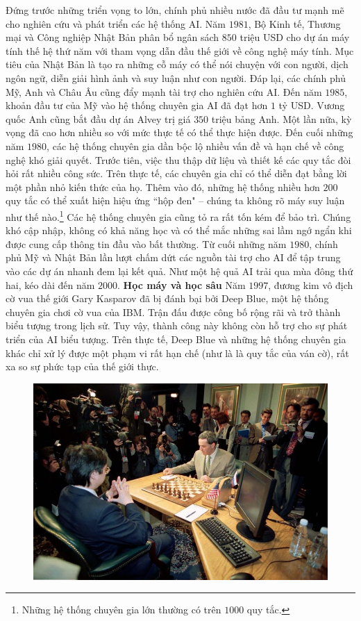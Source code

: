 \begin{multicols}{2}
	\vskip 0.1cm
	Đứng trước những triển vọng to lớn, chính phủ nhiều nước đã đầu tư mạnh mẽ cho nghiên cứu và phát triển các hệ thống AI. Năm $1981$, Bộ Kinh tế, Thương mại và Công nghiệp Nhật Bản phân bổ ngân sách $850$ triệu USD cho dự án máy tính thế hệ thứ năm với tham vọng dẫn đầu thế giới về công nghệ máy tính. Mục tiêu của Nhật Bản là tạo ra những cỗ máy có thể nói chuyện với con người, dịch ngôn ngữ, diễn giải hình ảnh và suy luận như con người. Đáp lại, các chính phủ Mỹ, Anh và Châu Âu cũng đẩy mạnh tài trợ cho nghiên cứu AI. Đến năm $1985$, khoản đầu tư của Mỹ vào hệ thống chuyên gia AI đã đạt hơn $1$ tỷ USD. Vương quốc Anh cũng bắt đầu dự án Alvey trị giá $350$ triệu bảng Anh.
	\vskip 0.1cm
	Một lần nữa, kỳ vọng đã cao hơn nhiều so với mức thực tế có thể thực hiện được. Đến cuối những năm $1980$, các hệ thống chuyên gia dần bộc lộ nhiều vấn đề và hạn chế về công nghệ khó giải quyết. Trước tiên, việc thu thập dữ liệu và thiết kế các quy tắc đòi hỏi rất nhiều công sức. Trên thực tế, các chuyên gia chỉ có thể diễn đạt bằng lời một phần nhỏ kiến thức của họ. Thêm vào đó, những hệ thống nhiều hơn $200$ quy tắc có thể xuất hiện hiệu ứng ``hộp đen" -- chúng ta không rõ máy suy luận như thế nào.\footnote{\color{cackithi}Những hệ thống chuyên gia lớn thường có trên $1000$ quy tắc.} Các hệ thống chuyên gia cũng tỏ ra rất tốn kém để bảo trì. Chúng khó cập nhập, không có khả năng học và có thể mắc những sai lầm ngớ ngẩn khi được cung cấp thông tin đầu vào bất thường. 
	\vskip 0.1cm
	Từ cuối những năm $1980$, chính phủ Mỹ và Nhật Bản lần lượt chấm dứt các nguồn tài trợ cho AI để tập trung vào các dự án nhanh đem lại kết quả. Như một hệ quả AI trải qua mùa đông thứ hai, kéo dài đến năm $2000$.
	\vskip 0.1cm
	\textbf{\color{cackithi}Học máy và học sâu}
	\vskip 0.1cm
	Năm $1997$, đương kim vô địch cờ vua thế giới Gary Kasparov đã bị đánh bại bởi Deep Blue, một hệ thống chuyên gia chơi cờ vua của IBM. Trận đấu được công bố rộng rãi và trở thành biểu tượng trong lịch sử. Tuy vậy, thành công này không còn hỗ trợ cho sự phát triển của AI biểu tượng. Trên thực tế, Deep Blue và những hệ thống chuyên gia khác chỉ xử lý được một phạm vi rất hạn chế (như là là quy tắc của ván cờ), rất xa so sự phức tạp của thế giới thực.
	\begin{figure}[H]
		\vspace*{-5pt}
		\centering
		\captionsetup{labelformat= empty, justification=centering}
		\includegraphics[width= 1\linewidth]{DeepBlue.jpg}

\end{figure}
\end{multicols}
